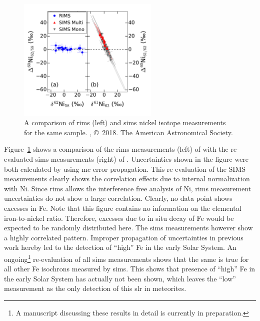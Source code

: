 \begin{figure}[tb]
    \centering
    \includegraphics[width=0.6\textwidth]{graphics/solar_system_slrs/trappitsch18_fig2}
    \caption{A comparison of \ac{rims} (left) and \ac{sims} nickel isotope measurements for the same sample. \citet{trappitsch18}, \copyright\ 2018. The American Astronomical Society.}
    \label{fig:solar_system_slrs:trappitsch18_fig2}
\end{figure}
Figure~\ref{fig:solar_system_slrs:trappitsch18_fig2} shows a comparison of the \ac{rims} measurements (left) of \citet{trappitsch18} with the re-evaluated \ac{sims} measurements (right) of \citet{telus18}. Uncertainties shown in the figure were both calculated by \citet{trappitsch18} using \ac{mc} error propagation. This re-evaluation of the SIMS measurements clearly shows the correlation effects due to internal normalization with Ni. Since \ac{rims} allows the interference free analysis of Ni, \ac{rims} measurement uncertainties do not show a large correlation. Clearly, no data point shows excesses in Fe. Note that this figure contains no information on the elemental iron-to-nickel ratio. Therefore, excesses due to in situ decay of Fe would be expected to be randomly distributed here. The \ac{sims} measurements however show a highly correlated pattern. Improper propagation of uncertainties in previous work hereby led to the detection of ``high'' Fe in the early Solar System. An ongoing\footnote{A manuscript discussing these results in detail is currently in preparation.} re-evaluation of all \ac{sims} measurements shows that the same is true for all other Fe isochrons measured by \ac{sims}. This shows that presence of ``high'' Fe in the early Solar System has actually not been shown, which leaves the ``low'' measurement as the only detection of this \ac{slr} in meteorites. 

